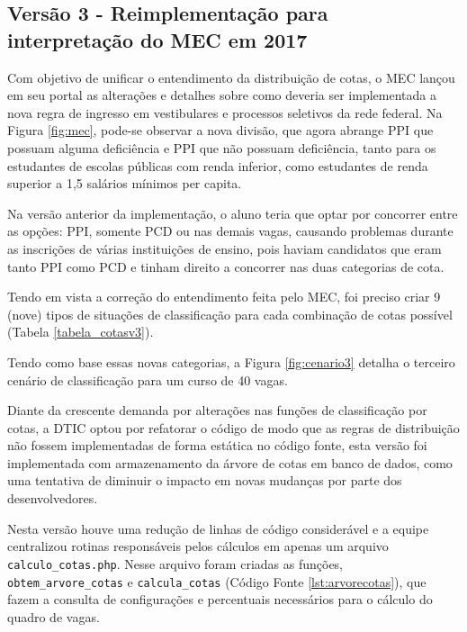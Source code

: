 \subsection{Versão 3 - Reimplementação para interpretação do MEC em 2017 }
\label{versao3}

Com objetivo de unificar o entendimento da distribuição de cotas, o \gls{MEC} lançou em seu portal as alterações e detalhes sobre como deveria ser implementada a nova regra de ingresso em vestibulares e processos seletivos da rede federal. Na Figura \ref{fig:mec}, pode-se observar a nova divisão, que agora abrange \gls{PPI} que possuam alguma deficiência e \gls{PPI} que não possuam deficiência, tanto para os estudantes de escolas públicas com renda inferior, como estudantes de renda superior a 1,5 salários mínimos per capita. 




Na versão anterior da implementação, o aluno teria que optar por concorrer entre as opções: \gls{PPI}, somente \gls{PCD} ou nas demais vagas, causando problemas durante as inscrições de várias instituições de ensino, pois haviam candidatos que eram tanto \gls{PPI} como \gls{PCD} e tinham direito a concorrer nas duas categorias de cota.

Tendo em vista a correção do entendimento feita pelo \gls{MEC}, foi preciso criar 9 (nove) tipos de situações de classificação para cada combinação de cotas possível (Tabela \ref{tabela_cotasv3}).



Tendo como base essas novas categorias, a Figura \ref{fig:cenario3} detalha o terceiro cenário de classificação para um curso de 40 vagas. 



\newpage
Diante da crescente demanda por alterações nas funções de classificação por cotas, a \gls{DTIC} optou por refatorar o código de modo que as regras de distribuição não fossem implementadas de forma estática no código fonte, esta versão foi implementada com armazenamento da árvore de cotas em banco de dados, como uma tentativa de diminuir o impacto em novas mudanças por parte dos desenvolvedores. 

Nesta versão houve uma redução de linhas de código considerável e a equipe centralizou rotinas responsáveis pelos cálculos em apenas um arquivo \texttt{calculo\_cotas.php}. Nesse arquivo foram criadas as funções, \texttt{obtem\_arvore\_cotas} e \texttt{calcula\_cotas} (Código Fonte \ref{lst:arvorecotas}), que fazem a consulta de configurações e percentuais necessários para o cálculo do quadro de vagas. 


